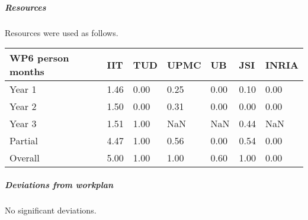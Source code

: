 

\subparagraph{Resources}

Resources were used as follows.

\begin{center}
\begin{tabular}{|C{1.5cm}|C{1.5cm}|C{1.5cm}|C{2cm}|C{2cm}|C{2cm}|C{2cm}|}
\hline
\footnotesize \textbf{WP6 person months}& \footnotesize \textbf{IIT}&\footnotesize \textbf{TUD}&\footnotesize \textbf{UPMC}& \footnotesize \textbf{UB} &\footnotesize \textbf{JSI} & \footnotesize \textbf{INRIA} \\ \hline
\footnotesize Year 1 &  1.46 & 0.00 & 0.25 & 0.00 & 0.10 & 0.00    \\  \hline
\footnotesize Year 2 &  1.50 & 0.00 & 0.31 & 0.00 & 0.00 & 0.00     \\  \hline
\footnotesize Year 3 &  1.51 & 1.00 & NaN & NaN & 0.44 & NaN     \\  \hline
\footnotesize Partial &  4.47 & 1.00 & 0.56 & 0.00 & 0.54 & 0.00 \\ \hline \hline
\footnotesize Overall &  5.00 & 1.00 & 1.00 & 0.60 & 1.00 & 0.00 \\ \hline
\end{tabular}
\end{center}

\subparagraph{Deviations from workplan} 
No significant deviations. 